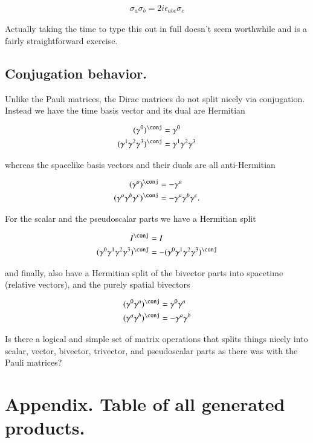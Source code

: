 \begin{align}
\sigma_a \sigma_b = 2 i \epsilon_{abc} \sigma_c
\end{align}

Actually taking the time to type this out in full doesn't seem worthwhile and is a fairly straightforward exercise.

\subsection{Conjugation behavior. }

Unlike the Pauli matrices, the Dirac matrices do not split nicely via conjugation.  Instead we have the time basis vector and its dual are Hermitian

\begin{align*}
(\gamma^0)^\conj &= \gamma^0 \\
(\gamma^1 \gamma^2 \gamma^3)^\conj &= \gamma^1 \gamma^2 \gamma^3
\end{align*}

whereas the spacelike basis vectors and their duals are all anti-Hermitian

\begin{align*}
(\gamma^a)^\conj &= -\gamma^a \\
(\gamma^a \gamma^b \gamma^c)^\conj &= - \gamma^a \gamma^b \gamma^c.
\end{align*}

For the scalar and the pseudoscalar parts we have a Hermitian split

\begin{align*}
I^\conj &= I \\
(\gamma^0 \gamma^1 \gamma^2 \gamma^3)^\conj &= -(\gamma^0 \gamma^1 \gamma^2 \gamma^3)^\conj
\end{align*}

and finally, also have a Hermitian split of the bivector parts into spacetime (relative vectors), and the purely spatial bivectors

\begin{align*}
(\gamma^0 \gamma^a)^\conj &= \gamma^0 \gamma^a \\
(\gamma^a \gamma^b)^\conj &= -\gamma^a \gamma^b
\end{align*}

Is there a logical and simple set of matrix operations that splits things nicely into scalar, vector, bivector, trivector, and pseudoscalar parts as there was with the Pauli
matrices?

\section{Appendix.  Table of all generated products. }

